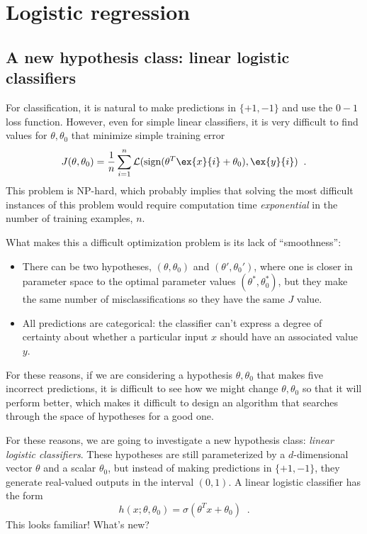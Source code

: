 \chapter{Logistic regression}
\label{chap-logistic}


\section{A new hypothesis class: linear logistic classifiers}

For classification, it is natural to make predictions in $\{+1, -1\}$
and use the $0-1$ loss function.   However, even for simple linear
classifiers, it is very difficult to
find values for $\theta, \theta_0$ that minimize simple training error
\[J(\theta, \theta_0) = \frac{1}{n} \sum_{i=1}^n \mathcal{L}(\text{sign}(\theta^T\ex{x}{i} + \theta_0),
  \ex{y}{i})\;\;.\] This problem is NP-hard, which probably
implies
that solving the most difficult instances of this problem would
require computation time {\em exponential} in the number of training
examples, $n$.

What makes this a difficult optimization problem is its lack of
``smoothness'':
\begin{itemize}
\item There can be two hypotheses, $(\theta, \theta_0)$  and
  $(\theta', \theta_0')$, where
  one is closer in parameter space to the optimal parameter values
  $(\theta^*, \theta_0^*)$, but they make the same number of
  misclassifications so they have the same $J$ value.
\item All predictions are categorical:  the classifier can't express a
  degree of certainty about whether a particular input $x$ should have
  an associated value $y$.
\end{itemize}
For these reasons, if we are considering a hypothesis $\theta,\theta_0$
that makes five incorrect predictions, it is difficult to see how we
might change $\theta,\theta_0$ so that it will perform better, which
makes it difficult to design an algorithm that searches through the
space of hypotheses for a good one.

For these reasons, we are going to investigate a new hypothesis class:
{\em linear logistic classifiers}.   These hypotheses are still
parameterized by a $d$-dimensional vector $\theta$ and a scalar
$\theta_0$, but instead of making predictions in $\{+1, -1\}$, they
generate real-valued outputs in the interval $(0, 1)$. A linear
logistic classifier has the form 
\[h(x; \theta, \theta_0) = \sigma(\theta^T x + \theta_0)\;\;.\]
This looks familiar!  What's new?

